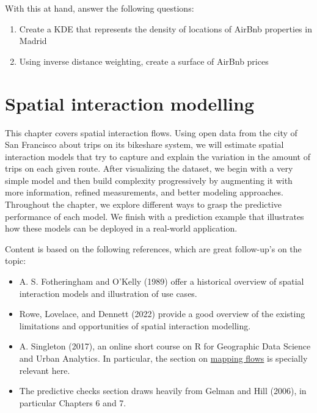 \documentclass[
  letterpaper,
  krantz2]{style/krantz}
\providecommand{\tightlist}{%
  \setlength{\itemsep}{0pt}\setlength{\parskip}{0pt}}\usepackage{longtable,booktabs,array}
\begin{document}
With this at hand, answer the following questions:

\begin{enumerate}
\def\labelenumi{\arabic{enumi}.}
\tightlist
\item
  Create a KDE that represents the density of locations of AirBnb
  properties in Madrid
\item
  Using inverse distance weighting, create a surface of AirBnb prices
\end{enumerate}

\hypertarget{spatial-interaction-modelling}{%
\chapter{Spatial interaction
modelling}\label{spatial-interaction-modelling}}

This chapter covers spatial interaction flows. Using open data from the
city of San Francisco about trips on its bikeshare system, we will
estimate spatial interaction models that try to capture and explain the
variation in the amount of trips on each given route. After visualizing
the dataset, we begin with a very simple model and then build complexity
progressively by augmenting it with more information, refined
measurements, and better modeling approaches. Throughout the chapter, we
explore different ways to grasp the predictive performance of each
model. We finish with a prediction example that illustrates how these
models can be deployed in a real-world application.

Content is based on the following references, which are great
follow-up's on the topic:

\begin{itemize}
\tightlist
\item
  A. S. Fotheringham and O'Kelly (1989) offer a historical overview of
  spatial interaction models and illustration of use cases.
\item
  Rowe, Lovelace, and Dennett (2022) provide a good overview of the
  existing limitations and opportunities of spatial interaction
  modelling.
\item
  A. Singleton (2017), an online short course on R for Geographic Data
  Science and Urban Analytics. In particular, the section on
  \href{https://github.com/alexsingleton/GDS_UA_2017/tree/master/Mapping_Flows}{mapping
  flows} is specially relevant here.
\item
  The predictive checks section draws heavily from Gelman and Hill
  (2006), in particular Chapters 6 and 7.
\end{itemize}
\end{document}
